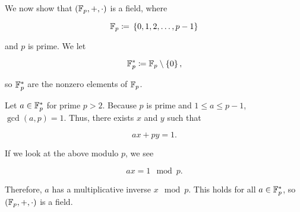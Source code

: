 \begin{example}
We now show that $\left( \mathbb{F}_{p},+,\cdot \right)$ is a \gls{field},
where

\begin{equation}
    \mathbb{F}_{p} \coloneqq{} \left\{ 0, 1, 2, \ldots, p-1 \right\}
\end{equation}

\noindent
and $p$ is prime.
We let

\begin{equation}
    \mathbb{F}_{p}^{*} \coloneqq{} \mathbb{F}_{p}\setminus\left\{ 0 \right\},
\end{equation}

\noindent
so $\mathbb{F}_{p}^{*}$ are the nonzero elements of $\mathbb{F}_{p}$.

Let $a\in\mathbb{F}_{p}^{*}$ for prime $p>2$.
Because $p$ is prime and $1\le a\le p-1$,
$\gcd(a,p) = 1$.
Thus, there exists $x$ and $y$ such that

\begin{equation}
    ax + py = 1.
\end{equation}

\noindent
If we look at the above modulo $p$, we see

\begin{equation}
    ax = 1 \mod p.
\end{equation}

\noindent
Therefore, $a$ has a multiplicative inverse $x\mod p$.
This holds for all $a\in\mathbb{F}_{p}^{*}$, so $\left( \mathbb{F}_{p},+,\cdot \right)$
is a \gls{field}.
\end{example}

